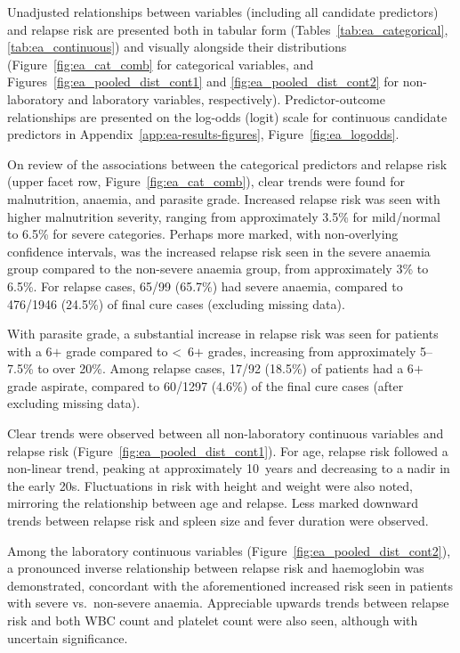 Unadjusted relationships between variables (including all candidate predictors) and relapse risk are presented both in tabular form (Tables~\ref{tab:ea_categorical}, \ref{tab:ea_continuous}) and visually alongside their distributions (Figure~\ref{fig:ea_cat_comb} for categorical variables, and Figures~\ref{fig:ea_pooled_dist_cont1} and \ref{fig:ea_pooled_dist_cont2} for non-laboratory and laboratory variables, respectively). Predictor-outcome relationships are presented on the log-odds (logit) scale for continuous candidate predictors in Appendix~\ref{app:ea-results-figures}, Figure~\ref{fig:ea_logodds}.

On review of the associations between the categorical predictors and relapse risk (upper facet row, Figure~\ref{fig:ea_cat_comb}), clear trends were found for malnutrition, anaemia, and parasite grade. Increased relapse risk was seen with higher malnutrition severity, ranging from approximately 3.5\% for mild/normal to 6.5\% for severe categories. Perhaps more marked, with non-overlying confidence intervals, was the increased relapse risk seen in the severe anaemia group compared to the non-severe anaemia group, from approximately 3\% to 6.5\%. For relapse cases, 65/99 (65.7\%) had severe anaemia, compared to 476/1946 (24.5\%) of final cure cases (excluding missing data).

With parasite grade, a substantial increase in relapse risk was seen for patients with a 6$+$ grade compared to <~6$+$ grades, increasing from approximately 5--7.5\% to over 20\%. Among relapse cases, 17/92 (18.5\%) of patients had a 6$+$ grade aspirate, compared to 60/1297 (4.6\%) of the final cure cases (after excluding missing data).

Clear trends were observed between all non-laboratory continuous variables and relapse risk (Figure~\ref{fig:ea_pooled_dist_cont1}). For age, relapse risk followed a non-linear trend, peaking at approximately 10~years and decreasing to a nadir in the early 20s. Fluctuations in risk with height and weight were also noted, mirroring the relationship between age and relapse. Less marked downward trends between relapse risk and spleen size and fever duration were observed.

Among the laboratory continuous variables (Figure~\ref{fig:ea_pooled_dist_cont2}), a pronounced inverse relationship between relapse risk and haemoglobin was demonstrated, concordant with the aforementioned increased risk seen in patients with severe vs.\ non-severe anaemia. Appreciable upwards trends between relapse risk and both WBC count and platelet count were also seen, although with uncertain significance.


